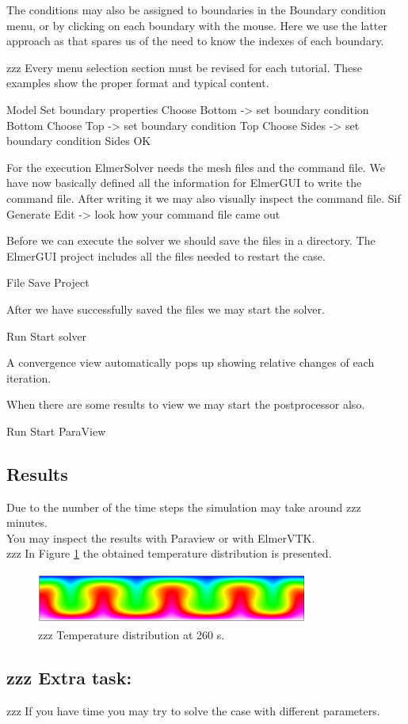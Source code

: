 The conditions may also be assigned to boundaries in the Boundary condition menu, or by clicking on each boundary with the mouse. Here we use the latter approach as that spares us of the need to know the indexes of each boundary.

zzz Every menu selection section must be revised for each tutorial.  These examples show the proper format and typical content.

\ttbegin
Model
  Set boundary properties
    Choose Bottom -> set boundary condition Bottom
    Choose Top -> set boundary condition Top
    Choose Sides -> set boundary condition Sides
   OK 
\ttend

For the execution ElmerSolver needs the mesh files and the command file.  We have now basically defined all the information for ElmerGUI to write the command file. After writing it we may also visually inspect the command file.
\ttbegin
Sif 
  Generate
  Edit -> look how your command file came out  
\ttend

Before we can execute the solver we should save the files in a directory.  The ElmerGUI project includes all the files needed to restart the case.

\ttbegin
File 
  Save Project
\ttend

After we have successfully saved the files we may start the solver.

\ttbegin
Run
  Start solver
\ttend

A convergence view automatically pops up showing relative changes of each iteration.

When there are some results to view we may start the postprocessor also.

\ttbegin
Run
  Start ParaView
\ttend

\subsection*{Results}

Due to the number of the time steps the simulation may take around zzz minutes.\\

You may inspect the results with Paraview or with ElmerVTK.\\

zzz In Figure \ref{fg:temp} the obtained temperature distribution is presented. 

\begin{figure}[H]
\centering
\includegraphics[width=0.8\textwidth]{temp}
\caption{zzz Temperature distribution at 260 s.}\label{fg:temp}
\end{figure} 

\subsection*{zzz Extra task:}

zzz If you have time you may try to solve the case with different parameters.

\hfill
